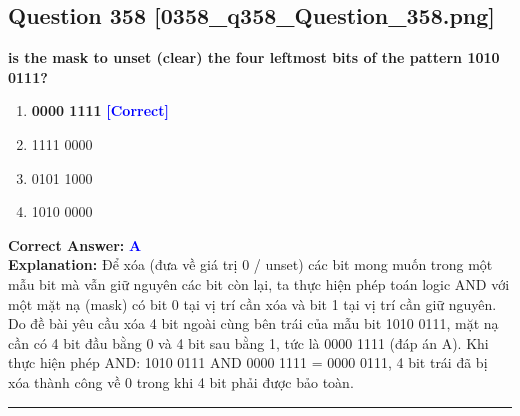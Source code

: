 \documentclass[11pt,a4paper]{article}
\begin{document}
\begin{minipage}{\textwidth}
\subsection*{Question 358 \quad \footnotesize{[0358\_q358\_Question\_358.png]}}
\noindent \textbf{is the mask to unset (clear) the four leftmost bits of the pattern 1010 0111?}

\begin{enumerate}[label=\Alph*.]
    \item \textbf{0000 1111} \hfill \textcolor{blue}{\textbf{[Correct]}}
    \item 1111 0000
    \item 0101 1000
    \item 1010 0000
\end{enumerate}

\noindent \textbf{Correct Answer:} \textcolor{blue}{\textbf{A}} \\[2pt]
\noindent \textbf{Explanation:} Để xóa (đưa về giá trị 0 / unset) các bit mong muốn trong một mẫu bit mà vẫn giữ nguyên các bit còn lại, ta thực hiện phép toán logic AND với một mặt nạ (mask) có bit 0 tại vị trí cần xóa và bit 1 tại vị trí cần giữ nguyên. Do đề bài yêu cầu xóa 4 bit ngoài cùng bên trái của mẫu bit 1010 0111, mặt nạ cần có 4 bit đầu bằng 0 và 4 bit sau bằng 1, tức là 0000 1111 (đáp án A). Khi thực hiện phép AND: 1010 0111 AND 0000 1111 = 0000 0111, 4 bit trái đã bị xóa thành công về 0 trong khi 4 bit phải được bảo toàn.

\par\vspace{0.3cm}
\hrule
\vspace{0.3cm}
\end{minipage}
\end{document}
